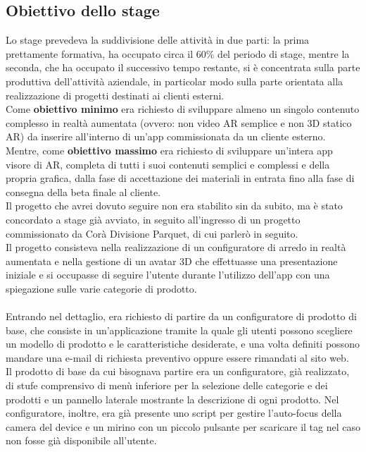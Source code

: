 \subsection{Obiettivo dello stage}
Lo stage prevedeva la suddivisione delle attivit\`a in due parti: la prima prettamente formativa, ha occupato circa il 60\% del periodo di stage, mentre la seconda, che ha occupato il successivo tempo restante, si \`e concentrata sulla parte produttiva dell’attività aziendale, in particolar modo sulla parte orientata alla realizzazione di progetti destinati ai clienti esterni.
\\
Come \textbf{obiettivo minimo} era richiesto di sviluppare almeno un singolo contenuto complesso in realtà aumentata (ovvero: non video AR semplice e non 3D statico AR) da inserire all’interno di un’app commissionata da un cliente esterno. 
\\
Mentre, come \textbf{obiettivo massimo} era richiesto di sviluppare un’intera app visore di AR, completa di tutti i suoi contenuti semplici e complessi e della propria grafica, dalla fase di accettazione dei materiali in entrata fino alla fase di consegna della beta finale al cliente.
\\
Il progetto che avrei dovuto seguire non era stabilito sin da subito, ma \`e stato concordato a stage gi\`a avviato, in seguito all'ingresso di un progetto commissionato da Cor\`a Divisione Parquet, di cui parler\`o in seguito.
\\
Il progetto consisteva nella realizzazione di un configuratore di arredo in realt\`a aumentata e nella gestione di un avatar 3D che effettuasse una presentazione iniziale e si occupasse di seguire l'utente durante l'utilizzo dell'app con una spiegazione sulle varie categorie di prodotto.
\\\\
Entrando nel dettaglio, era richiesto di partire da un configuratore di prodotto di base, che consiste in un'applicazione tramite la quale gli utenti possono scegliere un modello di prodotto e le caratteristiche desiderate, e una volta definiti possono mandare una e-mail di richiesta preventivo oppure essere rimandati al sito web. 
\\
Il prodotto di base da cui bisognava partire era un configuratore, gi\`a realizzato, di stufe comprensivo di men\`u inferiore per la selezione delle categorie e dei prodotti e un pannello laterale mostrante la descrizione di ogni prodotto. Nel configuratore, inoltre, era gi\`a presente uno script per gestire l'auto-focus della camera del device e un mirino con un piccolo pulsante per scaricare il tag nel caso non fosse gi\`a disponibile all'utente.
